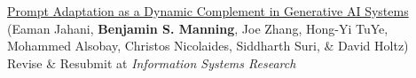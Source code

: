\documentclass[margin,line,pifont,palatino,courier, 9pt]{res}
\begin{document}
\begin{resume}

\href{https://arxiv.org/abs/2407.14333}{Prompt Adaptation as a Dynamic Complement in Generative AI Systems}\\
(Eaman Jahani\footnotemark[\value{footnote}], \textbf{Benjamin S. Manning}, Joe Zhang, Hong-Yi TuYe, Mohammed Alsobay, Christos Nicolaides, Siddharth Suri, \& David Holtz)\\
Revise \& Resubmit at \textit{Information Systems Research}


\end{resume}
\end{document}
